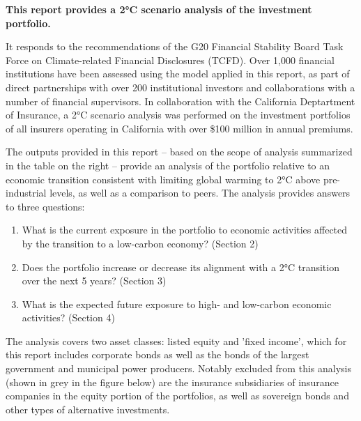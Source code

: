 \documentclass[10pt,table,a4]{article}\usepackage[]{graphicx}\usepackage[]{color}
\begin{document}
	\begin{multicols}{2}
		\textbf{This report provides a 2°C scenario analysis of the investment portfolio.} 
		
		It responds to the recommendations of the G20 Financial Stability Board Task Force on Climate-related Financial Disclosures (TCFD). Over 1,000 financial institutions have been assessed using the model applied in this report, as part of direct partnerships with over 200 institutional investors and collaborations with a number of financial 	supervisors.  In collaboration with the California Deptartment of Insurance, a 2°C scenario analysis was performed on the investment portfolios of all insurers operating in California with over \$100 million in annual premiums. 
		
		The outputs provided in this report – based on the scope of analysis summarized in the table on the right – provide an analysis of the portfolio relative to an economic transition consistent with limiting global warming to 	2°C above pre-industrial levels, as well as a comparison to peers. The analysis provides answers to three questions: 
		
		\begin{enumerate}
			\item{What is the current exposure in the portfolio to economic activities affected by the transition to a 	low-carbon economy? (Section 2)}
			\item{Does the portfolio increase or decrease its alignment with a 2°C transition over the next 5 years? 	(Section 3)}
			\item{What is the expected future exposure to high- and low-carbon economic activities? (Section 4)}
		\end{enumerate}
		
		The analysis covers two asset classes: listed equity and 'fixed income', which for this report includes corporate bonds as well as the bonds of the largest government and 	municipal power producers. Notably excluded from this analysis (shown in grey in the figure below) are the insurance subsidiaries of insurance companies in the equity portion of the portfolios, as well as sovereign bonds and other types of alternative investments. 


\end{multicols}
\end{document}
